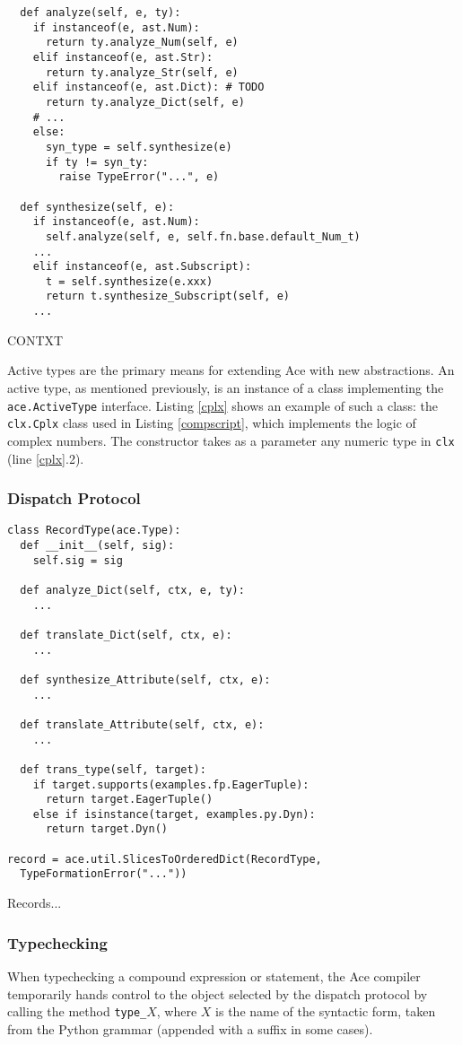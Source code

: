 \documentclass[10pt,preprint]{sigplanconf}
\begin{document}
{\begin{codelisting}
\begin{lstlisting}
  def analyze(self, e, ty):
    if instanceof(e, ast.Num):
      return ty.analyze_Num(self, e)
    elif instanceof(e, ast.Str):
      return ty.analyze_Str(self, e)
    elif instanceof(e, ast.Dict): # TODO
      return ty.analyze_Dict(self, e)
    # ...
    else:
      syn_type = self.synthesize(e)
      if ty != syn_ty:
        raise TypeError("...", e)
        
  def synthesize(self, e):
    if instanceof(e, ast.Num):
      self.analyze(self, e, self.fn.base.default_Num_t)
    ...
    elif instanceof(e, ast.Subscript):
      t = self.synthesize(e.xxx)
      return t.synthesize_Subscript(self, e)
    ...
\end{lstlisting}
\caption{CONTXT}
\label{context}
\end{codelisting}

Active types are the primary means for extending Ace with new abstractions. An active type, as mentioned previously, is an instance of a class implementing the \verb|ace.ActiveType| interface. Listing \ref{cplx} shows an example of such a class: the \verb|clx.Cplx| class used in Listing \ref{compscript}, which implements the logic of complex numbers. The constructor takes as a parameter any numeric type in \verb|clx| (line \ref{cplx}.2). 

\subsubsection{Dispatch Protocol}
\begin{codelisting}
\begin{lstlisting}
class RecordType(ace.Type):
  def __init__(self, sig):
    self.sig = sig

  def analyze_Dict(self, ctx, e, ty):
    ...

  def translate_Dict(self, ctx, e):
    ...

  def synthesize_Attribute(self, ctx, e): 
    ...

  def translate_Attribute(self, ctx, e):
    ...

  def trans_type(self, target):
    if target.supports(examples.fp.EagerTuple):
      return target.EagerTuple()
    else if isinstance(target, examples.py.Dyn):
      return target.Dyn()
      
record = ace.util.SlicesToOrderedDict(RecordType, 
  TypeFormationError("..."))
\end{lstlisting}
\caption{Records...}
\label{record}
\end{codelisting}
\subsubsection{Typechecking}
When typechecking a compound expression or statement, the Ace compiler temporarily hands control to the object selected by the dispatch protocol by calling the method \verb|type_|$X$, where $X$ is  the name of the syntactic form, taken from the Python grammar \cite{python} (appended with a suffix in some cases). 

}
\end{document}
